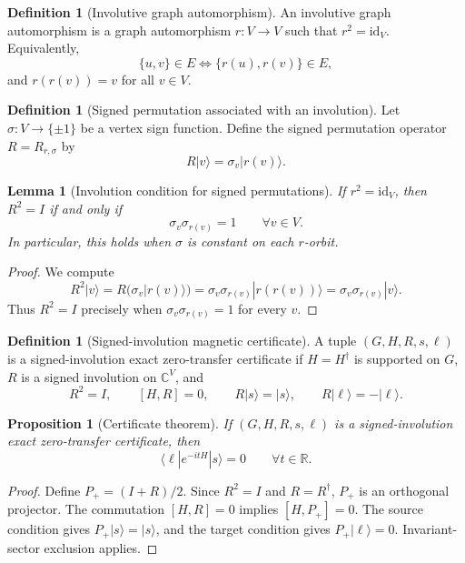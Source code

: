 \documentclass[11pt]{article}
\newtheorem{proposition}[theorem]{Proposition}
\newtheorem{lemma}[theorem]{Lemma}
\theoremstyle{definition}
\newtheorem{definition}[theorem]{Definition}
\newcommand{\R}{\mathbb R}
\newcommand{\id}{\mathrm{id}}
\begin{document}
\begin{definition}[Involutive graph automorphism]
An involutive graph automorphism is a graph automorphism $r:V\to V$ such that $r^2=\id_V$. Equivalently,
\[
\{u,v\}\in E\Longleftrightarrow \{r(u),r(v)\}\in E,
\]
and $r(r(v))=v$ for all $v\in V$.
\end{definition}

\begin{definition}[Signed permutation associated with an involution]
Let $\sigma:V\to\{\pm1\}$ be a vertex sign function. Define the signed permutation operator $R=R_{r,\sigma}$ by
\[
R|v\rangle=\sigma_v|r(v)\rangle.
\]
\end{definition}

\begin{lemma}[Involution condition for signed permutations]
If $r^2=\id_V$, then $R^2=I$ if and only if
\[
\sigma_v\sigma_{r(v)}=1\qquad \forall v\in V.
\]
In particular, this holds when $\sigma$ is constant on each $r$-orbit.
\end{lemma}

\begin{proof}
We compute
\[
R^2|v\rangle=R(\sigma_v|r(v)\rangle)=\sigma_v\sigma_{r(v)}|r(r(v))\rangle=\sigma_v\sigma_{r(v)}|v\rangle.
\]
Thus $R^2=I$ precisely when $\sigma_v\sigma_{r(v)}=1$ for every $v$.
\end{proof}

\begin{definition}[Signed-involution magnetic certificate]
A tuple $(G,H,R,s,\ell)$ is a signed-involution exact zero-transfer certificate if $H=H^\dagger$ is supported on $G$, $R$ is a signed involution on $\mathbb C^V$, and
\[
R^2=I,
\qquad [H,R]=0,
\qquad R|s\rangle=|s\rangle,
\qquad R|\ell\rangle=-|\ell\rangle.
\]
\end{definition}

\begin{proposition}[Certificate theorem]
If $(G,H,R,s,\ell)$ is a signed-involution exact zero-transfer certificate, then
\[
\langle \ell|e^{-itH}|s\rangle=0\qquad \forall t\in\R.
\]
\end{proposition}

\begin{proof}
Define $P_+=(I+R)/2$. Since $R^2=I$ and $R=R^\dagger$, $P_+$ is an orthogonal projector. The commutation $[H,R]=0$ implies $[H,P_+]=0$. The source condition gives $P_+|s\rangle=|s\rangle$, and the target condition gives $P_+|\ell\rangle=0$. Invariant-sector exclusion applies.
\end{proof}
\end{document}
